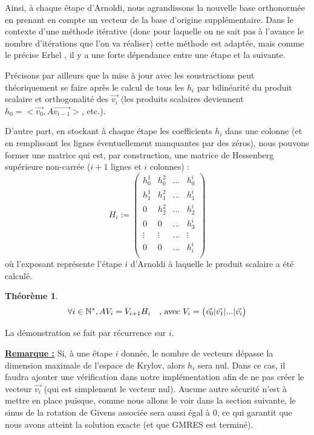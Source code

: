 \documentclass[11pt,a4paper,oneside]{memoir}
\newcommand{\N}{\mathbb{N}}	\newcommand{\Z}{\mathbb{Z}}
\theoremstyle{definition}
\theoremstyle{remark}
\theoremstyle{plain}
\newtheorem{theorem}{{Théorème}}
\begin{document}
Ainsi, à chaque étape d'Arnoldi, nous agrandissons la nouvelle base orthonormée en prenant en compte un vecteur de la base d'origine supplémentaire. Dans le contexte d'une méthode itérative (donc pour laquelle on ne sait pas à l'avance le nombre d'itérations que l'on va réaliser) cette méthode est adaptée, mais comme le précise Erhel \cite{erhel95}, il y a une forte dépendance entre une étape et la suivante. 

Précisons par ailleurs que la mise à jour avec les soustractions peut théoriquement se faire après le calcul de tous les $h_i$ par bilinéarité du produit scalaire et orthogonalité des $\vec{v_i}$ (les produits scalaires deviennent $h_0 = <\vec{v_0}, A \vec{v_{i-1}}>$, etc.).\medskip

D'autre part, en stockant à chaque étape les coefficients $h_i$ dans une colonne (et en remplissant les lignes éventuellement manquantes par des zéros), nous pouvons former une matrice qui est, par construction, une matrice de Hessenberg supérieure non-carrée ($i+1$ lignes et $i$ colonnes) :
\[
H_i := \left(
\begin{matrix}
h_0^1  & h_0^2  & ... & h_0^i \\
h_1^1  & h_1^2  & ... & h_1^i \\
0      & h_2^2  & ... & h_2^i \\
0      & 0      & ... & h_3^i \\
\vdots & \vdots & ... & \vdots \\
0      & 0      & ... & h_i^i \\
\end{matrix}
\right)
\]
où l'exposant représente l'étape $i$ d'Arnoldi à laquelle le produit scalaire a été calculé.

\begin{theorem}\label{theoreme_arnoldi}
\[
\forall i \in \N^*, A V_i = V_{i+1} H_i \text{\quad, avec } V_i = \left( \begin{matrix}
\vec{v_0} | \vec{v_1} | ... | \vec{v_i}
\end{matrix} \right)
\]
\end{theorem}
La démonstration se fait par récurrence sur $i$.\medskip

\underline{\textbf{Remarque :}} Si, à une étape $i$ donnée, le nombre de vecteurs dépasse la dimension maximale de l'espace de Krylov, alors $h_i$ sera nul. Dans ce cas, il faudra ajouter une vérification dans notre implémentation afin de ne pas créer le vecteur $\vec{v_i}$ (qui est simplement le vecteur nul). Aucune autre sécurité n'est à mettre en place puisque, comme nous allons le voir dans la section suivante, le sinus de la rotation de Givens associée sera aussi égal à $0$, ce qui garantit que nous avons atteint la solution exacte (et que GMRES est terminé). 
\end{document}
